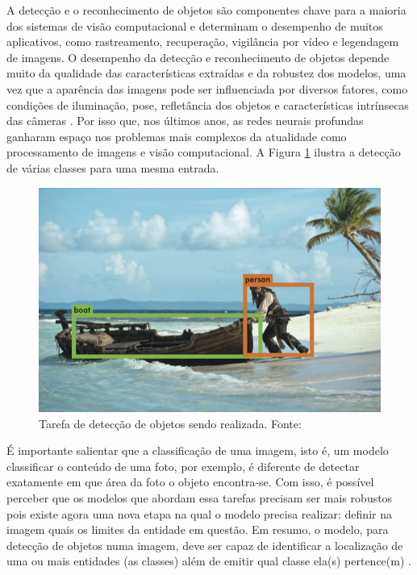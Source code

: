 
A detecção e o reconhecimento de objetos são componentes chave para a maioria dos sistemas de visão computacional e determinam o desempenho de muitos aplicativos, como rastreamento, recuperação, vigilância por vídeo e legendagem de imagens. O desempenho da detecção e reconhecimento de objetos depende muito da qualidade das características extraídas e da robustez dos modelos, uma vez que a aparência das imagens pode ser influenciada por diversos fatores, como condições de iluminação, pose, refletância dos objetos e características intrínsecas das câmeras \cite{Jiang:2019}. Por isso que, nos últimos anos, as redes neurais profundas ganharam espaço nos problemas mais complexos da atualidade como processamento de imagens e visão computacional. A Figura \ref{fig:example-detection} ilustra a detecção de várias classes para uma mesma entrada.

\begin{figure}[H]
    \centering
    \includegraphics[width=.7\textwidth]{img/example-detection.png}
    \caption{Tarefa de detecção de objetos sendo realizada. Fonte: \cite{Yolo:2015}}
    \label{fig:example-detection}
\end{figure}

É importante salientar que a classificação de uma imagem, isto é, um modelo classificar o conteúdo de uma foto, por exemplo, é diferente de detectar exatamente em que área da foto o objeto encontra-se. Com isso, é possível perceber que os modelos que abordam essa tarefas precisam ser mais robustos pois existe agora uma nova etapa na qual o modelo precisa realizar: definir na imagem quais os limites da entidade em questão. Em resumo, o modelo, para detecção de objetos numa imagem, deve ser capaz de identificar a localização de uma ou mais entidades (as classes) além de emitir qual classe ela(s) pertence(m) \cite{Michelucci:2019}.


